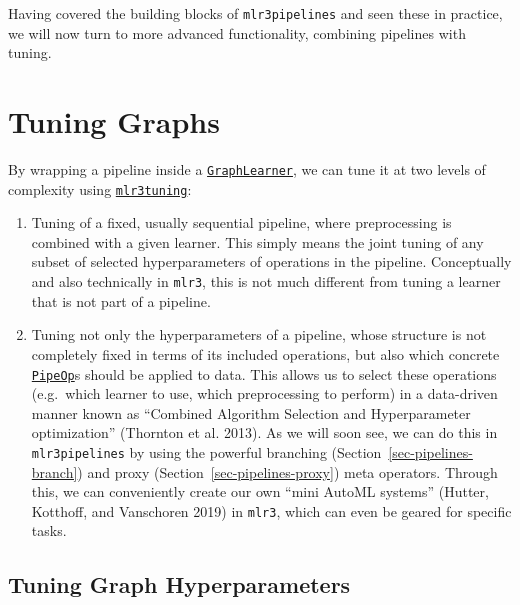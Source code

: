 Having covered the building blocks of \texttt{mlr3pipelines} and seen
these in practice, we will now turn to more advanced functionality,
combining pipelines with tuning.

\hypertarget{sec-pipelines-tuning}{%
\section{\texorpdfstring{Tuning
Graphs}{Tuning Graphs}}\label{sec-pipelines-tuning}}

By wrapping a pipeline inside a
\href{https://mlr3pipelines.mlr-org.com/reference/mlr_learners_graph.html}{\texttt{GraphLearner}},
we can tune it at two levels of complexity using
\href{https://mlr3tuning.mlr-org.com}{\texttt{mlr3tuning}}:

\begin{enumerate}
\def\labelenumi{\arabic{enumi}.}
\item
  Tuning of a fixed, usually sequential pipeline, where preprocessing is
  combined with a given learner. This simply means the joint tuning of
  any subset of selected hyperparameters of operations in the pipeline.
  Conceptually and also technically in \texttt{mlr3}, this is not much
  different from tuning a learner that is not part of a pipeline.
\item
  Tuning not only the hyperparameters of a pipeline, whose structure is
  not completely fixed in terms of its included operations, but also
  which concrete
  \href{https://mlr3pipelines.mlr-org.com/reference/PipeOp.html}{\texttt{PipeOp}}s
  should be applied to data. This allows us to select these operations
  (e.g.~which learner to use, which preprocessing to perform) in a
  data-driven manner known as ``Combined Algorithm Selection and
  Hyperparameter
  optimization''
  (Thornton et al. 2013). As we will soon see, we can do this in
  \texttt{mlr3pipelines} by using the powerful branching
  (Section~\ref{sec-pipelines-branch}) and proxy
  (Section~\ref{sec-pipelines-proxy}) meta operators. Through this, we
  can conveniently create our own ``mini AutoML systems'' (Hutter,
  Kotthoff, and Vanschoren 2019) in \texttt{mlr3}, which can even be
  geared for specific tasks.
\end{enumerate}

\hypertarget{sec-pipelines-combined}{%
\subsection{Tuning Graph Hyperparameters}\label{sec-pipelines-combined}}


